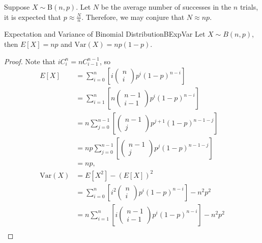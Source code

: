 \documentclass[math]{amznotes}
\theoremstyle{remark}
\begin{document}
Suppose $X \sim \mathrm{B}(n, p)$. Let $N$ be the average number of successes in the $n$ trials, it is expected that $p \approx \frac{N}{n}$. Therefore, we may conjure that $N \approx np$.
\begin{thmbox}{Expectation and Variance of Binomial Distribution}{BExpVar}
    Let $X \sim B(n, p)$, then $E[X] = np$ and $\mathrm{Var}(X) = np(1 - p)$.
    \tcblower
    \begin{proof}
        Note that $iC^n_i = nC^{n - 1}_{i - 1}$, so
        \begin{align*}
            E[X] & = \sum_{i = 0}^{n}\left[i \begin{pmatrix}
                n \\
                i
            \end{pmatrix}p^i(1 - p)^{n - i}\right] \\
            & = \sum_{i = 1}^{n}\left[n \begin{pmatrix}
                n - 1 \\
                i - 1
            \end{pmatrix}p^i(1 - p)^{n - i}\right] \\
            & = n\sum_{j = 0}^{n - 1}\left[\begin{pmatrix}
                n - 1 \\
                j
            \end{pmatrix}p^{j + 1}(1 - p)^{n - 1 - j}\right] \\
            & = np\sum_{j = 0}^{n - 1}\left[\begin{pmatrix}
                n - 1 \\
                j
            \end{pmatrix}p^j(1 - p)^{n - 1 - j}\right] \\
            & = np, \\
            \mathrm{Var}(X) & = E[X^2] - (E[X])^2 \\
            & = \sum_{i = 0}^{n}\left[i^2\begin{pmatrix}
                n \\
                i
            \end{pmatrix}p^i(1 - p)^{n - i}\right] - n^2p^2 \\
            & = n\sum_{i = 1}^{n}\left[i\begin{pmatrix}
                n - 1 \\
                i - 1
            \end{pmatrix}p^i(1 - p)^{n - i}\right] - n^2p^2 \\

\end{align*}
\end{proof}
\end{thmbox}
\end{document}
